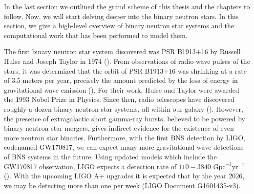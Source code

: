 


In the last section we outlined the grand scheme of this thesis and the chapters to follow. Now, we will start delving deeper into the binary neutron stars. In this section, we give a high-level overview of binary neutron star systems and the computational work that has been performed to model them. 


The first binary neutron star system discovered was PSR B1913+16 by Russell Hulse and Joseph Taylor in 1974 (\citet*{hulse:1975uf}). From observations of radio-wave pulses of the stars, it was determined that the orbit of PSR B1913+16 was shrinking at a rate of 3.5 meters per year, precisely the amount predicted by the loss of energy in gravitational wave emission (\citet*{1981sciam.245...74w}). For their work, Hulse and Taylor were awarded the 1993 Nobel Prize in Physics. Since then, radio telescopes have discovered roughly a dozen binary neutron star systems, all within our galaxy (\citet*{baiottireview2016}). However, the presence of extragalactic short gamma-ray bursts, believed to be powered by binary neutron star mergers, gives indirect evidence for the existence of even more neutron star binaries. Furthermore, with the first BNS detection by LIGO, codenamed GW170817, we can expect many more gravitational wave detections of BNS systems in the future. Using updated models which include the GW170817 observation, LIGO expects a detection rate of $110-3840$ $\text{Gpc}^{-3} \text{yr}^{-1}$ (\citet*{ligo2018gwtc}).  With the upcoming LIGO A+ upgrades it is expected that by the year 2026, we may be detecting more than one per week (LIGO Document G1601435-v3).

